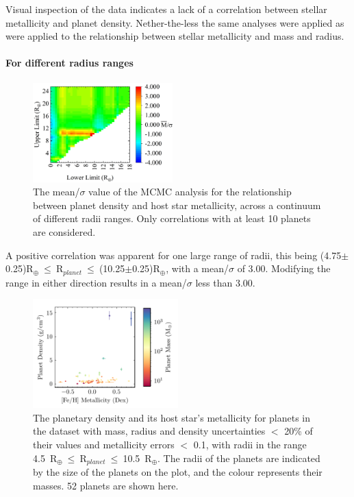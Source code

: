 \documentclass[a4paper,twocolumn,12pt]{article}
\begin{document}
Visual inspection of the data indicates a lack of a correlation between stellar metallicity and planet density. Nether-the-less the same analyses were applied as were applied to the relationship between stellar metallicity and mass and radius.




\paragraph{For different radius ranges}

\begin{figure}[h!]
    \centering
    \includegraphics[width=0.48\textwidth]{Graphs/FeH vs Density correlations - Radius ranges.png}
    \caption{The mean/$\sigma$ value of the MCMC analysis for the relationship between planet density and host star metallicity, across a continuum of different radii ranges. Only correlations with at least 10 planets are considered.}
    \label{figure: Fe/H vs Density correlations - Radii ranges}
\end{figure}


A positive correlation was apparent for one large range of radii, this being (4.75$\pm$0.25)R$_{\oplus}~\leq~$R$_{planet}~\leq~$(10.25$\pm$0.25)R$_{\oplus}$, with a mean/$\sigma$ of 3.00. Modifying the range in either direction results in a mean/$\sigma$ less than 3.00.

\begin{figure}[h!]
    \centering
    \includegraphics[width=0.5\textwidth]{Graphs/FeH vs Density Planet Plot Radius 4.5 to 10.5.pdf}
    \caption{The planetary density and its host star's metallicity for planets in the dataset with mass, radius and density uncertainties $<$ 20\% of their values and metallicity errors $<$ 0.1, with radii in the range 4.5~R$_{\oplus}~\leq~$R$_{planet}~\leq~$10.5~R$_{\oplus}$. The radii of the planets are indicated by the size of the planets on the plot, and the colour represents their masses. 52 planets are shown here.}
    \label{figure: Fe/H vs Density correlations - Radii range 1}
\end{figure}
\end{document}
